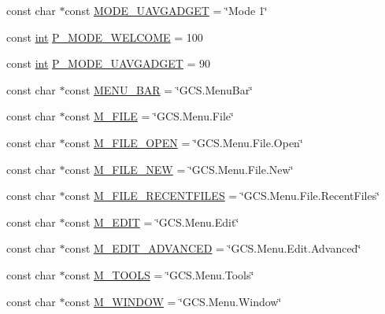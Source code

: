\begin{DoxyCompactItemize}
\item 
const char $\ast$const \hyperlink{group___core_plugin_ga9eb4e86719a191bbbe45b8b88bd5b952}{M\-O\-D\-E\-\_\-\-U\-A\-V\-G\-A\-D\-G\-E\-T} = \char`\"{}Mode 1\char`\"{}
\item 
const \hyperlink{ioapi_8h_a787fa3cf048117ba7123753c1e74fcd6}{int} \hyperlink{group___core_plugin_ga74beb1e358e2c4aececb356533024014}{P\-\_\-\-M\-O\-D\-E\-\_\-\-W\-E\-L\-C\-O\-M\-E} = 100
\item 
const \hyperlink{ioapi_8h_a787fa3cf048117ba7123753c1e74fcd6}{int} \hyperlink{group___core_plugin_ga0888b3ef54e714d32bc7be88f5ec9665}{P\-\_\-\-M\-O\-D\-E\-\_\-\-U\-A\-V\-G\-A\-D\-G\-E\-T} = 90
\item 
const char $\ast$const \hyperlink{group___core_plugin_ga50fb439908e7b14837faae97dded27a8}{M\-E\-N\-U\-\_\-\-B\-A\-R} = \char`\"{}G\-C\-S.\-Menu\-Bar\char`\"{}
\item 
const char $\ast$const \hyperlink{group___core_plugin_ga86cd43471b9407a34f91a707e8c37a94}{M\-\_\-\-F\-I\-L\-E} = \char`\"{}G\-C\-S.\-Menu.\-File\char`\"{}
\item 
const char $\ast$const \hyperlink{group___core_plugin_gad4c9f3e14e10c2a9d9c4211976eb8ce8}{M\-\_\-\-F\-I\-L\-E\-\_\-\-O\-P\-E\-N} = \char`\"{}G\-C\-S.\-Menu.\-File.\-Open\char`\"{}
\item 
const char $\ast$const \hyperlink{group___core_plugin_ga14c1da71abf115921c56a99fb3198fa2}{M\-\_\-\-F\-I\-L\-E\-\_\-\-N\-E\-W} = \char`\"{}G\-C\-S.\-Menu.\-File.\-New\char`\"{}
\item 
const char $\ast$const \hyperlink{group___core_plugin_gaa8324f1f075f171b33db9826a3b64b2b}{M\-\_\-\-F\-I\-L\-E\-\_\-\-R\-E\-C\-E\-N\-T\-F\-I\-L\-E\-S} = \char`\"{}G\-C\-S.\-Menu.\-File.\-Recent\-Files\char`\"{}
\item 
const char $\ast$const \hyperlink{group___core_plugin_ga86eba28e9c200c632b590f5acadbc93a}{M\-\_\-\-E\-D\-I\-T} = \char`\"{}G\-C\-S.\-Menu.\-Edit\char`\"{}
\item 
const char $\ast$const \hyperlink{group___core_plugin_gaef2e057b6ce5706a053e9e60a64c0199}{M\-\_\-\-E\-D\-I\-T\-\_\-\-A\-D\-V\-A\-N\-C\-E\-D} = \char`\"{}G\-C\-S.\-Menu.\-Edit.\-Advanced\char`\"{}
\item 
const char $\ast$const \hyperlink{group___core_plugin_ga2991b08955afff85a412c40a92e8d55e}{M\-\_\-\-T\-O\-O\-L\-S} = \char`\"{}G\-C\-S.\-Menu.\-Tools\char`\"{}
\item 
const char $\ast$const \hyperlink{group___core_plugin_ga665c8a19f32f02590458d538ebf8a197}{M\-\_\-\-W\-I\-N\-D\-O\-W} = \char`\"{}G\-C\-S.\-Menu.\-Window\char`\"{}

\end{DoxyCompactItemize}
